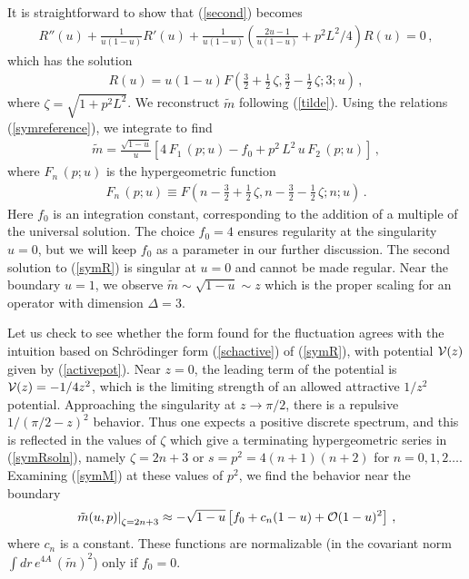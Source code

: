 \documentclass[a4paper,12pt]{article}
\def\mt{\tilde{m}}
\begin{document}
It is straightforward to show that (\ref{second}) becomes
\begin{eqnarray}
\label{symR}
R''(u) + \frac{1}{u(1-u)} R'(u) + \frac{1}{u(1-u)} \left( \frac{2u-1}{u(1-u)}+
p^2L^2/4 \right) R(u) = 0 \,,
\end{eqnarray}
which has the solution 
\begin{eqnarray}
\label{symRsoln}
R(u) = u (1-u) F\left( \frac{3}{2} + \frac{1}{2}\, \zeta, \frac{3}{2} - \frac{1}{2}\, \zeta; 3; u \right) \,,
\end{eqnarray}
where $\zeta = \sqrt{1 + p^2 L^2}$.  We reconstruct $\mt$ following
(\ref{tilde}).  Using the relations (\ref{symreference}), we integrate
to find
\begin{eqnarray}
\label{symM}
\mt = \frac{\sqrt{1-u}}{u} \left[ 4 \, F_1 \, (p;u) - f_0  +
p^2 \,L^2 \, u\, F_2\, (p;u)  \right] \,,
\end{eqnarray}
where $F_n \, (p ;u)$ is the hypergeometric function
\begin{eqnarray}
F_n \, (p ; u) \equiv F \left( n - \frac{3}{2} + \frac{1}{2}\, \zeta,  n - \frac{3}{2} - \frac{1}{2}\, \zeta; n;u \right)  \,.     
\end{eqnarray}
Here $f_0$ is an integration constant, corresponding to the addition
of a multiple of the universal solution.  The choice $f_0 = 4$ ensures
regularity at the singularity $u=0$, but we will keep $f_0$ as a
parameter in our further discussion.  The second solution to
(\ref{symR}) is singular at $u=0$ and cannot be made regular.  Near
the boundary $u=1$, we observe $\mt \sim \sqrt{1-u} \sim z$ which is
the proper scaling for an operator with dimension $\Delta = 3$.

Let us check to see whether the form found for the fluctuation agrees
with the intuition based on Schr\"odinger form (\ref{schactive}) of
(\ref{symR}), with potential ${\cal V}(z)$ given by (\ref{activepot}).
Near $z=0$, the leading term of the potential is ${\cal V}(z) =
-1/4z^2$, which is the limiting strength of an allowed attractive
$1/z^2$ potential.  Approaching the singularity at $z \rightarrow
\pi/2$, there is a repulsive $1/(\pi/2 - z)^2$ behavior.  Thus one
expects a positive discrete spectrum, and this is reflected in the
values of $\zeta$ which give a terminating hypergeometric series in
(\ref{symRsoln}), namely $\zeta = 2n +3$ or $s = p^2 = 4 (n+1)(n+2)$ for
$n = 0,1,2\ldots$.  Examining (\ref{symM}) at these values of $p^2$,
we find the behavior near the boundary
\begin{eqnarray}
\left. \mt(u,p) \right|_{\zeta = 2n+3} \approx - \sqrt{1-u} \left[ f_0 + c_n (1-u) + {\cal O}(1-u)^2 \right] \,,
\end{eqnarray}
where $c_n$ is a constant.  These functions are normalizable (in the
covariant norm $\int dr \, e^{4A} \, (\mt)^2$) only if $f_0 = 0$.
\end{document}
